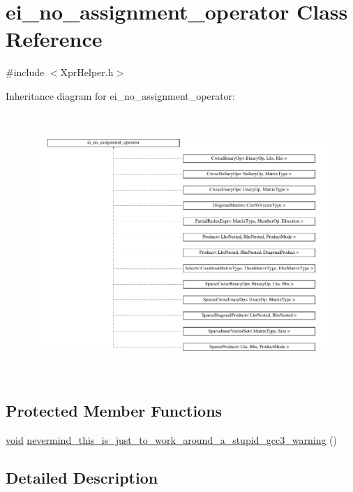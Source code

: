 \hypertarget{classei__no__assignment__operator}{\section{ei\-\_\-no\-\_\-assignment\-\_\-operator Class Reference}
\label{classei__no__assignment__operator}
}


{\ttfamily \#include $<$Xpr\-Helper.\-h$>$}

Inheritance diagram for ei\-\_\-no\-\_\-assignment\-\_\-operator\-:\begin{figure}[H]
\begin{center}
\leavevmode
\includegraphics[height=10.025576cm]{classei__no__assignment__operator}
\end{center}
\end{figure}
\subsection*{Protected Member Functions}
\begin{DoxyCompactItemize}
\item 
\hyperlink{group___u_a_v_objects_plugin_ga444cf2ff3f0ecbe028adce838d373f5c}{void} \hyperlink{classei__no__assignment__operator_a23ae6bfd0b065191cbbedc780ad05a4e}{nevermind\-\_\-this\-\_\-is\-\_\-just\-\_\-to\-\_\-work\-\_\-around\-\_\-a\-\_\-stupid\-\_\-gcc3\-\_\-warning} ()
\end{DoxyCompactItemize}


\subsection{Detailed Description}


